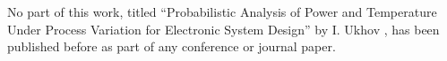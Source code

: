 No part of this work, titled ``Probabilistic Analysis of Power and Temperature Under Process Variation for Electronic System Design'' by I. Ukhov \etal, has been published before as part of any conference or journal paper.
